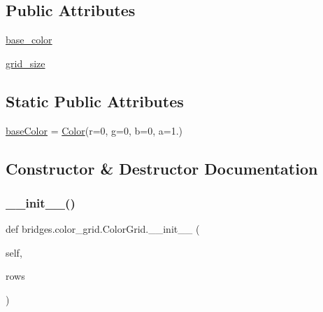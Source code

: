 \subsection*{Public Attributes}
\begin{DoxyCompactItemize}
\item 
\hyperlink{classbridges_1_1color__grid_1_1_color_grid_af7c28369f01fb4dfc82a5824583a6dbf}{base\+\_\+color}
\item 
\hyperlink{classbridges_1_1color__grid_1_1_color_grid_af248634de8b3d7b92feef01eed40821b}{grid\+\_\+size}
\end{DoxyCompactItemize}
\subsection*{Static Public Attributes}
\begin{DoxyCompactItemize}
\item 
\hyperlink{classbridges_1_1color__grid_1_1_color_grid_ad2db62703be80114e46b490ff02f8bd9}{base\+Color} = \hyperlink{classbridges_1_1color_1_1_color}{Color}(r=0, g=0, b=0, a=1.)
\end{DoxyCompactItemize}


\subsection{Constructor \& Destructor Documentation}
\mbox{\label{classbridges_1_1color__grid_1_1_color_grid_aa4b484e518b5fc0c970ea36e8500dbe5}} 
\subsubsection{\texorpdfstring{\+\_\+\+\_\+init\+\_\+\+\_\+()}{\_\_init\_\_()}}
{\footnotesize\ttfamily def bridges.\+color\+\_\+grid.\+Color\+Grid.\+\_\+\+\_\+init\+\_\+\+\_\+ (\begin{DoxyParamCaption}\item[{}]{self,  }\item[{}]{rows }\end{DoxyParamCaption})}



